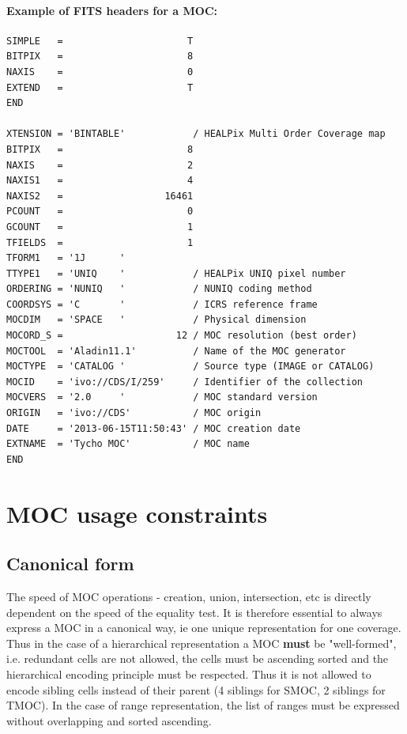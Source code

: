 \documentclass[11pt,a4paper]{ivoa}
\begin{document}

 
\paragraph{Example of FITS headers for a MOC:}
\par\noindent
\begin{lstlisting}[basicstyle=\footnotesize\ttfamily]
SIMPLE   =                      T
BITPIX   =                      8
NAXIS    =                      0
EXTEND   =                      T
END
    
XTENSION = 'BINTABLE'            / HEALPix Multi Order Coverage map
BITPIX   =                      8
NAXIS    =                      2
NAXIS1   =                      4
NAXIS2   =                  16461
PCOUNT   =                      0
GCOUNT   =                      1
TFIELDS  =                      1
TFORM1   = '1J      '
TTYPE1   = 'UNIQ    '            / HEALPix UNIQ pixel number
ORDERING = 'NUNIQ   '            / NUNIQ coding method
COORDSYS = 'C       '            / ICRS reference frame
MOCDIM   = 'SPACE   '            / Physical dimension
MOCORD_S =                    12 / MOC resolution (best order)
MOCTOOL  = 'Aladin11.1'          / Name of the MOC generator
MOCTYPE  = 'CATALOG '            / Source type (IMAGE or CATALOG)
MOCID    = 'ivo://CDS/I/259'     / Identifier of the collection
MOCVERS  = '2.0     '            / MOC standard version
ORIGIN   = 'ivo://CDS'           / MOC origin
DATE     = '2013-06-15T11:50:43' / MOC creation date
EXTNAME  = 'Tycho MOC'           / MOC name
END
\end{lstlisting}

\section{MOC usage constraints}

\subsection{Canonical form}
\label{sec:can}
The speed of MOC operations - creation, union, intersection, etc
is directly dependent on the speed of the equality test. It is
therefore essential to always express a MOC in a canonical way, ie
one unique representation for one coverage. Thus in the case of a
hierarchical representation a MOC \textbf{must} be "well-formed", i.e. 
redundant cells are not allowed, the cells must be ascending sorted
and the hierarchical encoding principle must be respected. Thus it
is not allowed to encode sibling cells instead of their parent (4
siblings for SMOC, 2 siblings for TMOC). In the case of range
representation, the list of ranges must be expressed without
overlapping and sorted ascending.
\end{document}
